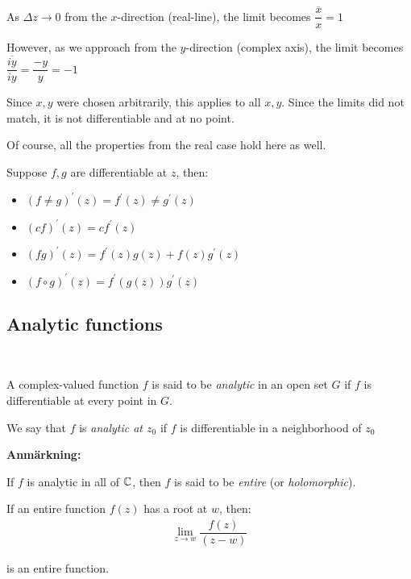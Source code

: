 \noindent As $\Delta z\to0$ from the $x$-direction (real-line), the limit becomes $\dfrac{\overline{x}}{x} = 1$\par
\noindent However, as we approach from the $y$-direction (complex axis), the limit becomes $\dfrac{\overline{iy}}{iy} = \dfrac{-y}{y} = -1$\par
\noindent Since $x,y$ were chosen arbitrarily, this applies to all $x,y$. Since the limits did not match, it is not differentiable and at no point.
\par\bigskip
\noindent Of course, all the properties from the real case hold here as well.\par
\noindent Suppose $f,g$ are differentiable at $z$, then:\par
\begin{itemize}
  \item $(f\neq g)^{\prime}(z) = f^{\prime}(z)\neq g^{\prime}(z)$
  \item $(cf)^{\prime}(z) = cf^{\prime}(z)$
  \item $(fg)^{\prime}(z) = f^{\prime}(z)g(z)+f(z)g^{\prime}(z)$
  \item $(f\circ g)^{\prime}(z) = f^{\prime}(g(z))g^{\prime}(z)$
\end{itemize}
\newpage
\subsection{Analytic functions}\hfill\\
\par\bigskip
\begin{theo}{}
  A complex-valued function $f$ is said to be \textit{analytic} in an open set $G$ if $f$ is differentiable at every point in $G$.
  \par\bigskip
  \noindent We say that $f$ is \textit{analytic at $z_0$}  if $f$ is differentiable in a neighborhood of $z_0$
\end{theo}
\par\bigskip
\noindent\textbf{Anmärkning:}\par
\noindent If $f$ is analytic in all of $\mathbb{C}$, then $f$ is said to be \textit{entire} (or \textit{holomorphic}).
\par\bigskip
\begin{theo}[wobgowegb]{}
  If an entire function $f(z)$ has a root at $w$, then:
  \begin{equation*}
    \begin{gathered}
      \lim_{z\to w}\dfrac{f(z)}{(z-w)}
    \end{gathered}
  \end{equation*}\par
  \noindent is an entire function.
\end{theo}

